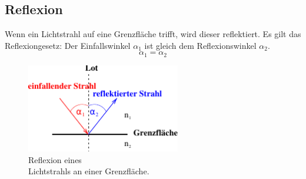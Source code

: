 \subsection{Reflexion}
\label{subsec:Reflexion}

\begin{minipage}[t]{0.5\textwidth}
    Wenn ein Lichtstrahl auf eine Grenzfläche trifft, wird  dieser reflektiert. 
    Es gilt das Reflexiongesetz:
    Der Einfallswinkel $\alpha_1$ ist gleich dem Reflexionswinkel $\alpha_2$.
    \begin{equation}
        \alpha_1 = \alpha_2
        \label{eqn:Reflexion}
    \end{equation}
\end{minipage}
\begin{minipage}[t]{0.5\textwidth}
    \begin{figure}[H]
        \centering
        \includegraphics[width=0.6\textwidth]{build/Abb_2a.pdf}
        \caption {Reflexion eines \\Lichtstrahls an einer Grenzfläche\cite[2]{V400}.}
        \label{fig:Abb_1}
    \end{figure}
\end{minipage}

